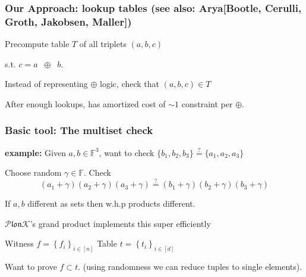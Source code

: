 \documentclass[shadesubsections,compress,14pt,mathserif]{beamer}
\newcommand{\xor}{\ensuremath{\oplus}}
\newcommand{\plonk}{\ensuremath{\mathcal{P} \mathfrak{lon}\mathcal{K}}}
\newcommand{\F}{\ensuremath{\mathbb F}}
\newcommand{\sett}[2]{\ensuremath{\left\{#1\right\}_{#2}}}
\begin{document}
\begin{frame}
 \frametitle{Our Approach: lookup tables {\normalsize (see also: Arya{\footnotesize [Bootle, Cerulli, Groth, Jakobsen, Maller]})}}
 
 
 Precompute table $T$ of all triplets $(a,b,c)$
  
  s.t. $c=a\;\;\xor\;\;b$.\pause
  
    \vspace{0.2in}

Instead of representing
$\xor$ logic, check that $(a,b,c)\in T$\pause
    \vspace{0.2in}
  
After enough lookups, has amortized cost of $\sim 1$ constraint per $\xor$.

    
\end{frame}



\begin{frame}
 
\end{frame}

 
\begin{frame}
\frametitle{Basic tool: The multiset check}
\textbf{example:} Given $a,b\in \F^3$, want to check $\{b_1,b_2,b_3\} \stackrel{?}{=} \{a_1,a_2,a_3\}$ \\ \pause
 \vspace{0.2in}

  
 Choose random $\gamma\in \F$. Check
  \[(a_1 + \gamma)(a_2+ \gamma)(a_3 + \gamma) \stackrel{?}{=} (b_1+\gamma)(b_2+\gamma)(b_3+\gamma)\]\pause

 \vspace{0.2in}
 If $a,b$ different as sets then w.h.p products different.\pause
 
  \vspace{0.2in}

 \plonk's grand product implements this super efficiently
\end{frame}



\begin{frame}
Witness $f=\sett{f_i}{i\in [n]}$
Table $t=\sett{t_i}{i\in [d]}$

Want to prove $f\subset t$.
{\small (using randomness we can reduce tuples to single elements)}.
\end{frame}
\end{document}
